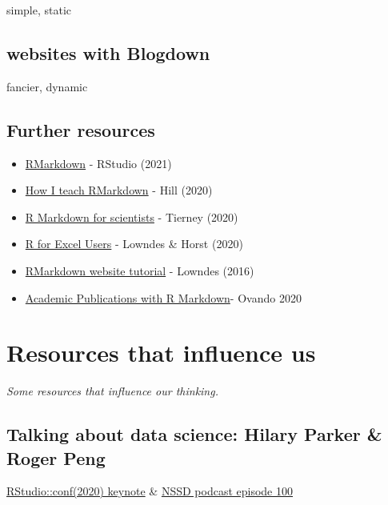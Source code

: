 \documentclass[
  letterpaper,
  DIV=11,
  numbers=noendperiod]{scrreprt}
\providecommand{\tightlist}{%
  \setlength{\itemsep}{0pt}\setlength{\parskip}{0pt}}
\begin{document}
simple, static

\hypertarget{websites-with-blogdown}{%
\section{websites with Blogdown}\label{websites-with-blogdown}}

fancier, dynamic

\hypertarget{further-resources-3}{%
\section{Further resources}\label{further-resources-3}}

\begin{itemize}
\tightlist
\item
  \href{https://rmarkdown.rstudio.com}{RMarkdown} - RStudio (2021)
\item
  \href{https://alison.rbind.io/post/2020-05-28-how-i-teach-r-markdown}{How
  I teach RMarkdown} - Hill (2020)
\item
  \href{https://rmd4sci.njtierney.com}{R Markdown for scientists} -
  Tierney (2020)
\item
  \href{https://rstudio-conf-2020.github.io/r-for-excel}{R for Excel
  Users} - Lowndes \& Horst (2020)
\item
  \href{http://jules32.github.io/rmarkdown-website-tutorial}{RMarkdown
  website tutorial} - Lowndes (2016)
\item
  \href{https://danovando.github.io/publications-with-rmarkdown/presentations/pubs-with-rmarkdown\#9}{Academic
  Publications with R Markdown}- Ovando 2020
\end{itemize}

\hypertarget{resources-influence}{%
\chapter{Resources that influence us}\label{resources-influence}}

\emph{Some resources that influence our thinking.}

\hypertarget{talking-about-data-science-hilary-parker-roger-peng}{%
\section{Talking about data science: Hilary Parker \& Roger
Peng}\label{talking-about-data-science-hilary-parker-roger-peng}}

\href{https://rstudio.com/resources/rstudioconf-2020/not-so-standard-deviations-episode-100/}{RStudio::conf(2020)
keynote} \&
\href{http://nssdeviations.com/100-live-from-rstudio-conf-2020}{NSSD
podcast episode 100}
\end{document}
